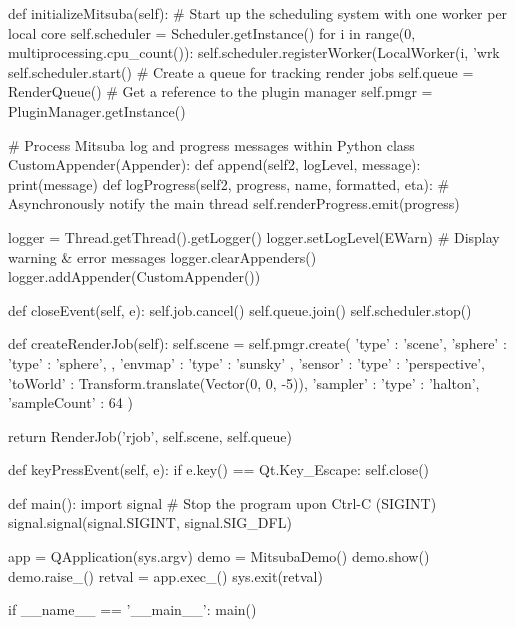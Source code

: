 \begin{python}
    def initializeMitsuba(self):
        # Start up the scheduling system with one worker per local core
        self.scheduler = Scheduler.getInstance()
        for i in range(0, multiprocessing.cpu_count()):
            self.scheduler.registerWorker(LocalWorker(i, 'wrk%
        self.scheduler.start()
        # Create a queue for tracking render jobs
        self.queue = RenderQueue()
        # Get a reference to the plugin manager
        self.pmgr = PluginManager.getInstance()

        # Process Mitsuba log and progress messages within Python
        class CustomAppender(Appender):
            def append(self2, logLevel, message):
                print(message)
            def logProgress(self2, progress, name, formatted, eta):
                # Asynchronously notify the main thread
                self.renderProgress.emit(progress)

        logger = Thread.getThread().getLogger()
        logger.setLogLevel(EWarn) # Display warning & error messages
        logger.clearAppenders()
        logger.addAppender(CustomAppender())

    def closeEvent(self, e):
        self.job.cancel()
        self.queue.join()
        self.scheduler.stop()

    def createRenderJob(self):
        self.scene = self.pmgr.create({
            'type' : 'scene',
            'sphere' : {
                'type' : 'sphere',
            },
            'envmap' : {
                'type' : 'sunsky'
            },
            'sensor' : {
                'type' : 'perspective',
                'toWorld' : Transform.translate(Vector(0, 0, -5)),
                'sampler' : {
                    'type' : 'halton',
                    'sampleCount' : 64
                }
            }
        })

        return RenderJob('rjob', self.scene, self.queue)

    def keyPressEvent(self, e):
        if e.key() == Qt.Key_Escape:
            self.close()

def main():
    import signal
    # Stop the program upon Ctrl-C (SIGINT)
    signal.signal(signal.SIGINT, signal.SIG_DFL)

    app = QApplication(sys.argv)
    demo = MitsubaDemo()
    demo.show()
    demo.raise_()
    retval = app.exec_()
    sys.exit(retval)

if __name__ == '__main__':
    main()
\end{python}

